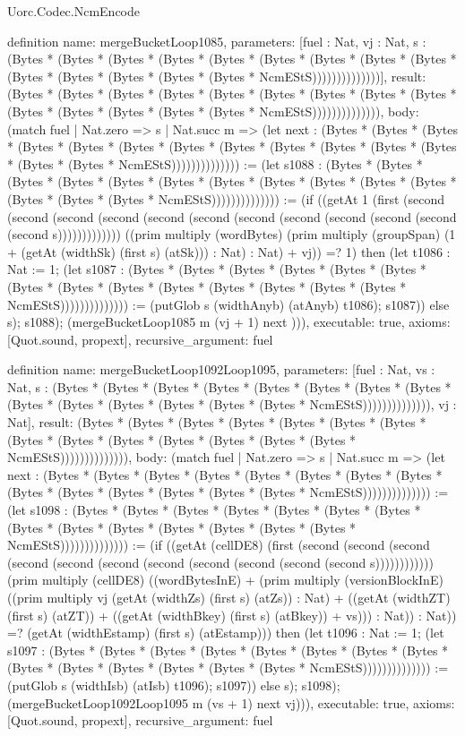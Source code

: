 \begin{lexlean}{Uorc.Codec.NcmEncode}
\begin{semanticmodule}
definition{
  name: mergeBucketLoop1085,
  parameters: [fuel : Nat, vj : Nat, s : (Bytes * (Bytes * (Bytes * (Bytes * (Bytes * (Bytes * (Bytes * (Bytes * (Bytes * (Bytes * (Bytes * (Bytes * (Bytes * (Bytes * NcmEStS))))))))))))))],
  result: (Bytes * (Bytes * (Bytes * (Bytes * (Bytes * (Bytes * (Bytes * (Bytes * (Bytes * (Bytes * (Bytes * (Bytes * (Bytes * (Bytes * NcmEStS)))))))))))))),
  body: (match fuel
    | Nat.zero => s
    | Nat.succ m => (let next : (Bytes * (Bytes * (Bytes * (Bytes * (Bytes * (Bytes * (Bytes * (Bytes * (Bytes * (Bytes * (Bytes * (Bytes * (Bytes * (Bytes * NcmEStS)))))))))))))) := (let s1088 : (Bytes * (Bytes * (Bytes * (Bytes * (Bytes * (Bytes * (Bytes * (Bytes * (Bytes * (Bytes * (Bytes * (Bytes * (Bytes * (Bytes * NcmEStS)))))))))))))) := (if ((getAt 1 (first (second (second (second (second (second (second (second (second (second (second (second (second s))))))))))))) ((prim multiply (wordBytes) (prim multiply (groupSpan) (1 + (getAt (widthSk) (first s) (atSk))) : Nat) : Nat) + vj)) =? 1) then (let t1086 : Nat := 1; (let s1087 : (Bytes * (Bytes * (Bytes * (Bytes * (Bytes * (Bytes * (Bytes * (Bytes * (Bytes * (Bytes * (Bytes * (Bytes * (Bytes * (Bytes * NcmEStS)))))))))))))) := (putGlob s (widthAnyb) (atAnyb) t1086); s1087)) else s); s1088); (mergeBucketLoop1085 m (vj + 1) next ))),
  executable: true,
  axioms: [Quot.sound, propext],
  recursive_argument: fuel
}

definition{
  name: mergeBucketLoop1092Loop1095,
  parameters: [fuel : Nat, vs : Nat, s : (Bytes * (Bytes * (Bytes * (Bytes * (Bytes * (Bytes * (Bytes * (Bytes * (Bytes * (Bytes * (Bytes * (Bytes * (Bytes * (Bytes * NcmEStS)))))))))))))), vj : Nat],
  result: (Bytes * (Bytes * (Bytes * (Bytes * (Bytes * (Bytes * (Bytes * (Bytes * (Bytes * (Bytes * (Bytes * (Bytes * (Bytes * (Bytes * NcmEStS)))))))))))))),
  body: (match fuel
    | Nat.zero => s
    | Nat.succ m => (let next : (Bytes * (Bytes * (Bytes * (Bytes * (Bytes * (Bytes * (Bytes * (Bytes * (Bytes * (Bytes * (Bytes * (Bytes * (Bytes * (Bytes * NcmEStS)))))))))))))) := (let s1098 : (Bytes * (Bytes * (Bytes * (Bytes * (Bytes * (Bytes * (Bytes * (Bytes * (Bytes * (Bytes * (Bytes * (Bytes * (Bytes * (Bytes * NcmEStS)))))))))))))) := (if ((getAt (cellDE8) (first (second (second (second (second (second (second (second (second (second (second (second s)))))))))))) (prim multiply (cellDE8) ((wordBytesInE) + (prim multiply (versionBlockInE) ((prim multiply vj (getAt (widthZs) (first s) (atZs)) : Nat) + ((getAt (widthZT) (first s) (atZT)) + ((getAt (widthBkey) (first s) (atBkey)) + vs))) : Nat)) : Nat)) =? (getAt (widthEstamp) (first s) (atEstamp))) then (let t1096 : Nat := 1; (let s1097 : (Bytes * (Bytes * (Bytes * (Bytes * (Bytes * (Bytes * (Bytes * (Bytes * (Bytes * (Bytes * (Bytes * (Bytes * (Bytes * (Bytes * NcmEStS)))))))))))))) := (putGlob s (widthIsb) (atIsb) t1096); s1097)) else s); s1098); (mergeBucketLoop1092Loop1095 m (vs + 1) next vj))),
  executable: true,
  axioms: [Quot.sound, propext],
  recursive_argument: fuel
}


\end{semanticmodule}
\end{lexlean}
